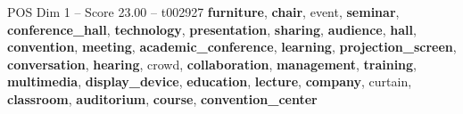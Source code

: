 \begin{textsample}{POS Dim 1 – Score 23.00 – t002927}  \label{ex:f1_pos_035}
\textbf{furniture}, \textbf{chair}, event, \textbf{seminar}, \textbf{conference\_hall}, \textbf{technology}, \textbf{presentation}, \textbf{sharing}, \textbf{audience}, \textbf{hall}, \textbf{convention}, \textbf{meeting}, \textbf{academic\_conference}, \textbf{learning}, \textbf{projection\_screen}, \textbf{conversation}, \textbf{hearing}, crowd, \textbf{collaboration}, \textbf{management}, \textbf{training}, \textbf{multimedia}, \textbf{display\_device}, \textbf{education}, \textbf{lecture}, \textbf{company}, curtain, \textbf{classroom}, \textbf{auditorium}, \textbf{course}, \textbf{convention\_center}

\end{textsample}
